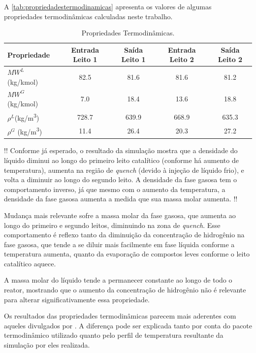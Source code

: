 A \autoref{tab:propriedadestermodinamicas} apresenta os valores de algumas
propriedades termodinâmicas calculadas neste trabalho.

\begin{table}[!htb]
\begin{center}
\caption{Propriedades Termodinâmicas.}
\label{tab:propriedadestermodinamicas}
\small
\begin{tabular}{lcccc}
{Propriedade} & {Entrada Leito 1} & {Saída Leito 1} & {Entrada Leito 2} &
{Saída Leito 2}
\\
\hline
{$MW^{L}$ (\si{kg/kmol})} & 82.5 & 81.6 & 81.6 & 81.2 \\
{$MW^{G}$ (\si{kg/kmol})} & 7.0 & 18.4 & 13.6 & 18.8 \\
{$\rho^{L}$(\si{kg/m^3})} & 728.7 & 639.9 & 668.9 & 635.3 \\
{$\rho^{G}$ (\si{kg/m^3})} & 11.4 & 26.4 & 20.3 & 27.2 \\
\bottomrule
\end{tabular}
\end{center}
\end{table}

!! Conforme já esperado, o resultado da simulação mostra que a densidade do
líquido diminui ao longo do primeiro leito catalítico (conforme há aumento de
temperatura), aumenta na região de \emph{quench} (devido à injeção de líquido
frio), e volta a diminuir ao longo do segundo leito. A densidade da fase gasosa
tem o comportamento inverso, já que mesmo com o aumento da temperatura, a
densidade da fase gasosa aumenta a medida que sua massa molar aumenta. !!

Mudança mais relevante sofre a massa molar da fase gasosa, que aumenta ao
longo do primeiro e segundo leitos, diminuindo na zona de \emph{quench}. Esse
comportamento é reflexo tanto da diminuição da concentração de hidrogênio na
fase gasosa, que tende a se diluir mais facilmente em fase líquida conforme a
temperatura aumenta, quanto da evaporação de compostos leves conforme o leito
catalítico aquece.

A massa molar do líquido tende a permanecer constante ao longo de todo o
reator, mostrando que o aumento da concentração de hidrogênio não é relevante
para alterar significativamente essa propriedade.

Os resultados das propriedades termodinâmicas parecem mais aderentes com
aqueles divulgados por . A diferença pode ser explicada
tanto por conta do pacote termodinâmico utilizado quanto pelo perfil de
temperatura resultante da simulação por eles realizada.

